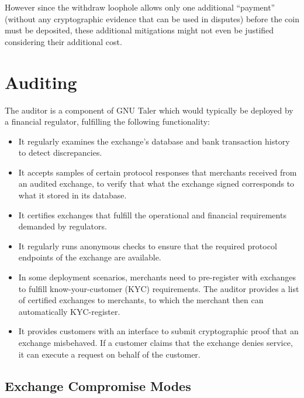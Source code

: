 However since the withdraw loophole allows only one additional ``payment'' (without any
cryptographic evidence that can be used in disputes) before the coin must be deposited,
these additional mitigations might not even be justified considering their additional cost.


\section{Auditing}

The auditor is a component of GNU Taler which would typically be deployed by a
financial regulator, fulfilling the following functionality:

\begin{itemize}
  \item It regularly examines the exchange's database and
    bank transaction history to detect discrepancies.
  \item It accepts samples of certain protocol responses that merchants
    received from an audited exchange, to verify that what the exchange signed
    corresponds to what it stored in its database.
  \item It certifies exchanges that fulfill the operational and financial requirements
    demanded by regulators.
  \item It regularly runs anonymous checks to ensure that the required protocol
    endpoints of the exchange are available.
  \item In some deployment scenarios, merchants need to pre-register with exchanges to fulfill know-your-customer (KYC) requirements.
    The auditor provides a list of certified exchanges to merchants,
    to which the merchant then can automatically KYC-register.
  \item It provides customers with an interface to submit cryptographic proof that an exchange
    misbehaved.  If a customer claims that the exchange denies service, it can execute a request on
    behalf of the customer.
\end{itemize}




\subsection{Exchange Compromise Modes}

